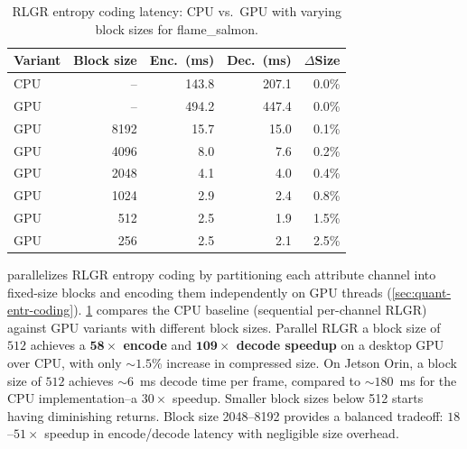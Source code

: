%
\begin{table}[t]
  \centering
  \footnotesize
  \begin{tabular}{l|rr|r|r}
    \hline
    \textbf{Variant} & \textbf{Block size} & \textbf{Enc.\ (ms)} & \textbf{Dec.\ (ms)} & \textbf{$\Delta$Size} \\
    \hline\hline
    CPU &  --   & 143.8  & 207.1 & 0.0\% \\
    GPU &  --   & 494.2  & 447.4 & 0.0\% \\
    GPU & 8192  & 15.7  & 15.0   & 0.1\% \\
    GPU & 4096  & 8.0   & 7.6    & 0.2\% \\
    GPU & 2048  & 4.1   & 4.0    & 0.4\% \\
    GPU & 1024  & 2.9   & 2.4    & 0.8\% \\
    GPU & 512   & 2.5   & 1.9    & 1.5\% \\
    GPU & 256   & 2.5   & 2.1    & 2.5\% \\
    \hline
  \end{tabular}
  \caption{RLGR entropy coding latency: CPU vs.\ GPU with varying block sizes for flame\_salmon.}
  \label{tab:ablation-rlgr}
\end{table}
%
\gsnfs{} parallelizes RLGR entropy coding by partitioning each attribute channel into fixed-size blocks and encoding them independently on GPU threads (\cref{sec:quant-entr-coding}).
%
\cref{tab:ablation-rlgr} compares the CPU baseline (sequential per-channel RLGR) against GPU variants with different block sizes.
%
Parallel RLGR a block size of $512$ achieves a \textbf{$\boldsymbol{58\times}$ encode} and \textbf{$\boldsymbol{109\times}$ decode speedup} on a desktop GPU over CPU, with only ${\sim}1.5$\% increase in compressed size.
%
On Jetson Orin, a block size of $512$ achieves ${\sim}6$~ms decode time per frame, compared to ${\sim}180$~ms for the CPU implementation--a $30\times$ speedup.
%
Smaller block sizes below 512 starts having diminishing returns.
%
Block size 2048--8192 provides a balanced tradeoff: $18$--$51\times$ speedup in encode/decode latency with negligible size overhead.

